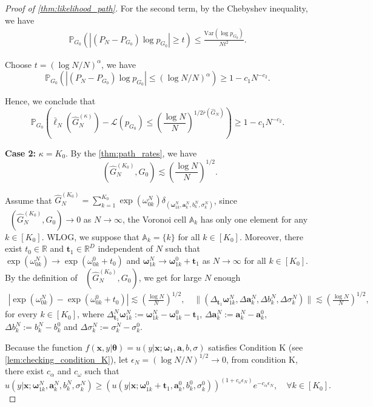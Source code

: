 \documentclass[twoside]{article}
\DeclareMathOperator*{\VDE}{D_{E}}
\theoremstyle{plain}
\theoremstyle{definition}
\theoremstyle{plain}
\def\vtheta{{\bm{\theta}}}
\def\vomega{{\bm{\omega}}}
\def\va{{\bm{a}}}
\def\vt{{\bm{t}}}
\def\vx{{\bm{x}}}
\def\sA{{\mathbb{A}}}
\newcommand{\Var}{\mathrm{Var}}
\newcommand{\cL}{\mathcal{L}}
\begin{document}
\begin{proof}[Proof of \cref{thm:likelihood_path}]
   For the second term, by the Chebyshev inequality, we have 
    \begin{align}
        \mathbb{P}_{G_0} (|(P_N - P_{G_0}) \log{p_{G_0}}| \geq t) \leq \frac{\Var (\log p_{G_0})}{N t^2}. \label{inequality of Case 1}
    \end{align}

    Choose $t = (\log N/ N)^{\alpha}$, we have $$\mathbb{P}_{G_0} (|(P_N - P_{G_0}) \log{p_{G_0}}| \leq (\log N/ N)^{\alpha}) \geq 1 - c_1 N^{-c_2}.$$

    Hence, we conclude that $$\mathbb{P}_{G_0} \left(\bar{\ell}_N (\widehat{G}^{(\kappa)}_N) - \cL (p_{G_0}) \leq \left( \dfrac{\log N}{N} \right)^{1/2 \bar{r}(\widehat{G}_N)}\right) \geq 1 - c_1 N^{-c_2}. $$

    \textbf{Case 2:} $\kappa = K_0$. By the \cref{thm:path_rates}, we have $$\VDE (\widehat{G}^{(K_0)}_N, G_0) \lesssim \left( \frac{\log N}{N} \right)^{1/2}.$$

    Assume that $\widehat{G}^{(K_0)}_N = \sum_{k = 1}^{K_0} \exp(\omega_{0k}^{N}) \delta_{(\vomega_{1k}^{N}, \va^N_k, b^N_k, \sigma^N_k)}$, since $\VDE (\widehat{G}^{(K_0)}_N, G_0) \to 0$ as $N \to \infty$, the Voronoi cell $\sA_k$ has only one element for any $k \in [K_0]$. WLOG, we suppose that $\sA_k = \{ k \}$ for all $k \in [K_0]$. Moreover, there exist $t_0 \in \mathbb{R}$ and $\vt_1 \in \mathbb{R}^D$ independent of $N$ such that $\exp(\omega_{0k}^N) \to \exp(\omega_{0k}^0 + t_0)$ and $\vomega_{1k}^N \to \vomega_{1k}^0 + \vt_1$ as $N \to \infty$ for all $k \in [K_0]$. By the definition of $\VDE (\widehat{G}^{(K_0)}_N, G_0)$, we get for large $N$ enough
    \begin{align}
        |\exp(\omega_{0k}^N) - \exp(\omega_{0k}^{0} + t_{0})| \lesssim \left(\frac{\log N}{N}\right)^{1/2}, \quad
        \|(\Delta_{\vt_{1}} \vomega_{1k}^N, \Delta \va_{k}^N,  \Delta b_{k}^N, \Delta \sigma_{k}^N)\| \lesssim \left(\frac{\log N}{N}\right)^{1/2}, \nonumber
    \end{align}
    for every $k \in [K_0]$, where $\Delta_{\vt_{1}}^N \vomega_{1k}^N := \vomega_{1k}^N - \vomega_{1k}^0 - \vt_1$, $\Delta \va_{k}^N := \va_{k}^N - \va_{k}^0$, $\Delta b_{k}^N := b_k^N - b_k^0$ and $\Delta \sigma_{k}^N := \sigma_k^N - \sigma_k^0$.

    Because the function $f(\vx, y | \vtheta) = u (y | \vx; \vomega_{1}, \va, b, \sigma)$ satisfies Condition K (see \cref{lem:checking_condition_K}), let $\epsilon_N = (\log N/N)^{1/2} \to 0$, from condition K, there exist $c_{\alpha}$ and $c_{\omega}$ such that $$u (y | \vx; \vomega_{1k}^N, \va_k^N, b_k^N, \sigma_k^N) \geq (u (y | \vx; \vomega_{1k}^0 + \vt_1, \va_k^0, b_k^0, \sigma_k^0))^{(1 + c_{\omega} \epsilon_N)} e^{-c_{\alpha} \epsilon_N}, \quad \forall k \in [K_0].$$


\end{proof}
\end{document}
